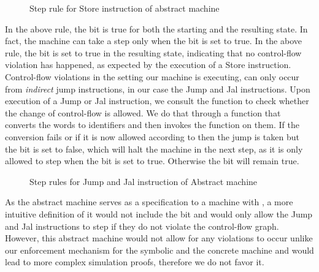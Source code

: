 \begin{figure}[!htb]
\caption{Step rule for Store instruction of abstract machine}
\end{figure}

In the above rule, the \ok bit is true for both the starting and the
resulting state. In fact, the machine can take a step only when the
\ok bit is set to true. In the above rule, the \ok bit is set to true
in the resulting state, indicating that no control-flow violation has
happened, as expected by the execution of a Store
instruction. Control-flow violations in the \NWC setting our machine
is executing, can only occur from \emph{indirect} jump instructions,
in our case the Jump and Jal instructions. Upon execution of a Jump or
Jal instruction, we consult the \CFG function to check whether the
change of control-flow is allowed. We do that through a function \J
that converts the words to identifiers and then invokes the \CFG
function on them. If the conversion fails or if it is now allowed
according to \CFG then the jump is taken but the \ok bit is set to
false, which will halt the machine in the next step, as it is only
allowed to step when the \ok bit is set to true. Otherwise the \ok bit
will remain true.

\begin{figure}[!htpb]
\bigskip

\caption{Step rules for Jump and Jal instruction of Abstract machine}
\end{figure}

As the abstract machine serves as a specification to a machine with
\CFI, a more intuitive definition of it would not include the \ok bit
and would only allow the Jump and Jal instructions to step if they do
not violate the control-flow graph. However, this abstract machine
would not allow for any violations to occur unlike our enforcement
mechanism for the symbolic and the concrete machine and would lead to
more complex simulation proofs, therefore we do not favor it.

